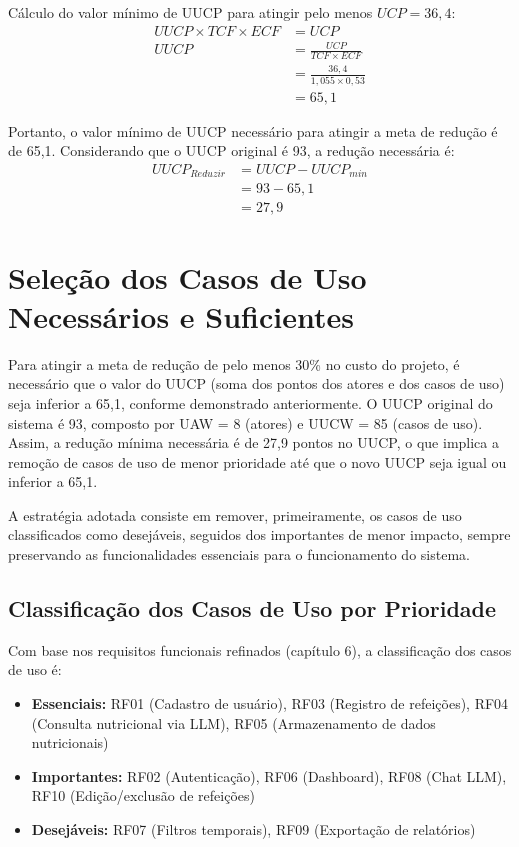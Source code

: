 Cálculo do valor mínimo de UUCP para atingir pelo menos $UCP = 36,4$:
\begin{align*}
    UUCP \times TCF \times ECF &= UCP\\
    UUCP &= \frac{UCP}{TCF \times ECF}\\
    &= \frac{36,4}{1,055 \times 0,53}\\
    &= 65,1
\end{align*}

Portanto, o valor mínimo de UUCP necessário para atingir a meta de redução é de 65,1. Considerando que o UUCP original é 93, a redução necessária é:
\begin{align*}
    UUCP_{Reduzir} &= UUCP - UUCP_{min}\\
    &= 93 - 65,1\\
    &= 27,9
\end{align*}

\section{Seleção dos Casos de Uso Necessários e Suficientes}

Para atingir a meta de redução de pelo menos 30\% no custo do projeto, é necessário que o valor do UUCP (soma dos pontos dos atores e dos casos de uso) seja inferior a 65,1, conforme demonstrado anteriormente. O UUCP original do sistema é 93, composto por UAW = 8 (atores) e UUCW = 85 (casos de uso). Assim, a redução mínima necessária é de 27,9 pontos no UUCP, o que implica a remoção de casos de uso de menor prioridade até que o novo UUCP seja igual ou inferior a 65,1.

A estratégia adotada consiste em remover, primeiramente, os casos de uso classificados como desejáveis, seguidos dos importantes de menor impacto, sempre preservando as funcionalidades essenciais para o funcionamento do sistema.

\subsection{Classificação dos Casos de Uso por Prioridade}

Com base nos requisitos funcionais refinados (capítulo 6), a classificação dos casos de uso é:

\begin{itemize}
    \item \textbf{Essenciais:} RF01 (Cadastro de usuário), RF03 (Registro de refeições), RF04 (Consulta nutricional via LLM), RF05 (Armazenamento de dados nutricionais)
    \item \textbf{Importantes:} RF02 (Autenticação), RF06 (Dashboard), RF08 (Chat LLM), RF10 (Edição/exclusão de refeições)
    \item \textbf{Desejáveis:} RF07 (Filtros temporais), RF09 (Exportação de relatórios)
\end{itemize}

